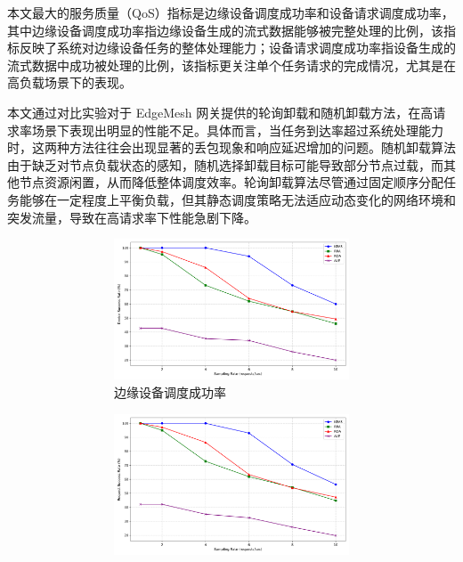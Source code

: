 本文最大的服务质量（QoS）指标是边缘设备调度成功率和设备请求调度成功率，其中边缘设备调度成功率指边缘设备生成的流式数据能够被完整处理的比例，该指标反映了系统对边缘设备任务的整体处理能力；设备请求调度成功率指设备生成的流式数据中成功被处理的比例，该指标更关注单个任务请求的完成情况，尤其是在高负载场景下的表现。

本文通过对比实验对于 EdgeMesh 网关提供的轮询卸载和随机卸载方法，在高请求率场景下表现出明显的性能不足。具体而言，当任务到达率超过系统处理能力时，这两种方法往往会出现显著的丢包现象和响应延迟增加的问题。随机卸载算法由于缺乏对节点负载状态的感知，随机选择卸载目标可能导致部分节点过载，而其他节点资源闲置，从而降低整体调度效率。轮询卸载算法尽管通过固定顺序分配任务能够在一定程度上平衡负载，但其静态调度策略无法适应动态变化的网络环境和突发流量，导致在高请求率下性能急剧下降。

\begin{figure}[ht]
    \centering
    \begin{subfigure}{\textwidth}
        \centering
        \begin{subfigure}{0.48\textwidth}
            \centering
            \includegraphics[width=\linewidth]{pics/expr/exp9_device_success_rate.png}
            \caption{边缘设备调度成功率}
            \vspace{0.3cm}
        \end{subfigure}
        \begin{subfigure}{0.48\textwidth}
            \centering
            \includegraphics[width=\linewidth]{pics/expr/exp9_request_success_rate.png}

\end{subfigure}
\end{subfigure}
\end{figure}
